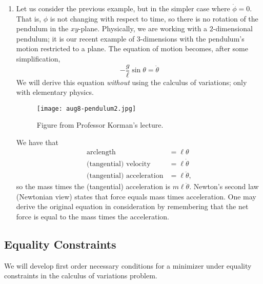 \documentclass[11pt]{article}
\begin{document}
\begin{enumerate}
\item
Let us consider the previous example, but in the simpler case where $\dot{\phi} = 0$. That is, $\phi$ is not changing with respect to time, so there is no rotation of the pendulum in the $xy$-plane. Physically, we are working with a $2$-dimensional pendulum; it is our recent example of $3$-dimensions with the pendulum's motion restricted to a plane. The equation of motion becomes, after some simplification,
\[
-\frac{g}{\ell} \sin \theta = \ddot{\theta}
\]
We will derive this equation \emph{without} using the calculus of variations; only with elementary physics.
\begin{figure}[H]
\texttt{[image: aug8-pendulum2.jpg]}
\centering
\caption{Figure from Professor Korman's lecture.}
\end{figure}
We have that
\begin{align*}
\text{arclength} &= \ell \theta \\
\text{(tangential) velocity} &= \ell \dot{\theta} \\
\text{(tangential) acceleration} &= \ell \ddot{\theta},
\end{align*}
so the mass times the (tangential) acceleration is $m \ell \ddot{\theta}$. Newton's second law (Newtonian view) states that force equals mass times acceleration. One may derive the original equation in consideration by remembering that the net force is equal to the mass times the acceleration.
\end{enumerate}

\subsection{Equality Constraints}

We will develop first order necessary conditions for a minimizer under equality constraints in the calculus of variations problem.
\end{document}
